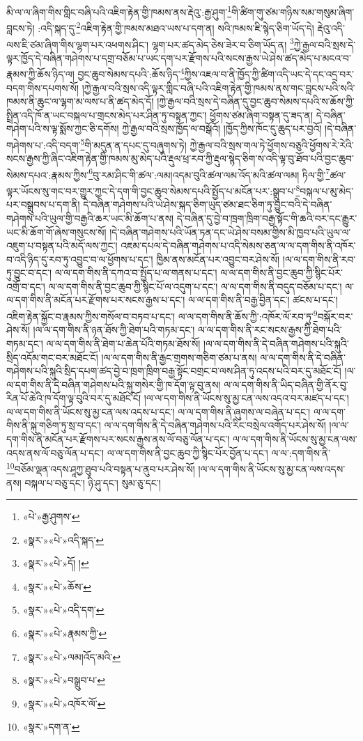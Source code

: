 མི་ལ་ལ་ཞིག་གིས་གླིང་བཞི་པའི་འཇིག་རྟེན་གྱི་ཁམས་ནས་རྡེའུ་:རྒྱ་ཤུག་\footnote{«པེ་»རྒྱ་ཤུགས་}གི་ཚིག་གུ་ཙམ་གཉིས་སམ་གསུམ་ཞིག་བླངས་ཏེ། :འདི་སྐད་དུ་\footnote{«སྣར་»«པེ་»འདི་སྐད་}འཇིག་རྟེན་གྱི་ཁམས་མཐའ་ཡས་པ་དག་ན། སའི་ཁམས་ཇི་སྙེད་ཅིག་ཡོད་དེ། རྡེའུ་འདི་ལས་ཇི་ཙམ་ཞིག་གིས་ལྷག་པར་འཕགས་ཤིང་། ལྷག་པར་ཚད་མེད་ཅེས་ཟེར་བ་ཅིག་ཡོད་ན། \footnote{«སྣར་»«པེ་»དོ། ། }ཀྱེ་རྒྱལ་བའི་སྲས་དེ་ལྟར་ཁྱོད་དེ་བཞིན་གཤེགས་པ་དགྲ་བཅོམ་པ་ཡང་དག་པར་རྫོགས་པའི་སངས་རྒྱས་ཡེ་ཤེས་ཚད་མེད་པ་མངའ་བ་རྣམས་ཀྱི་ཆོས་ཉིད་ལ། བྱང་ཆུབ་སེམས་དཔའི་:ཆོས་ཉིད་\footnote{«སྣར་»«པེ་»ཆོས་}ཀྱིས་འཇལ་བ་ནི་ཁྱོད་ཀྱི་ཚིག་འདི་ཡང་དེ་དང་འདྲ་བར་བདག་གིས་དཔགས་སོ། །ཀྱེ་རྒྱལ་བའི་སྲས་འདི་ལྟར་གླིང་བཞི་པའི་འཇིག་རྟེན་གྱི་ཁམས་ནས་གང་བླངས་པའི་སའི་ཁམས་ནི་ཆུང་ལ་ལྷག་མ་ལས་པ་ནི་ཚད་མེད་དོ། །ཀྱེ་རྒྱལ་བའི་སྲས་དེ་བཞིན་དུ་བྱང་ཆུབ་སེམས་དཔའི་ས་ཆོས་ཀྱི་སྤྲིན་འདི་ཁོ་ན་ཡང་བསྐལ་པ་གྲངས་མེད་པར་ཤིན་ཏུ་བསྟན་ཀྱང་། ཕྱོགས་ཙམ་ཞིག་བསྟན་དུ་ཟད་ན། དེ་བཞིན་གཤེག་པའི་ས་ལྟ་སྨོས་ཀྱང་ཅི་དགོས། ཀྱེ་རྒྱལ་བའི་སྲས་ཁྱོད་ལ་བསྒོའོ། །ཁྱོད་ཀྱིས་ཁོང་དུ་ཆུད་པར་བྱའོ། །དེ་བཞིན་གཤེགས་པ་:འདི་བདག་\footnote{«སྣར་»«པེ་»འདི་དག་}གི་མདུན་ན་དཔང་དུ་བཞུགས་ཏེ། ཀྱེ་རྒྱལ་བའི་སྲས་གལ་ཏེ་ཕྱོགས་བཅུའི་ཕྱོགས་རེ་རེའི་སངས་རྒྱས་ཀྱི་ཞིང་འཇིག་རྟེན་གྱི་ཁམས་མུ་མེད་པའི་རྡུལ་ཕྲ་རབ་ཀྱི་རྡུལ་སྙེད་ཅིག་ས་འདི་ལྟ་བུ་ཐོབ་པའི་བྱང་ཆུབ་སེམས་དཔའ་:རྣམས་ཀྱིས་\footnote{«སྣར་»«པེ་»རྣམས་ཀྱི་}བུ་རམ་ཤིང་གི་ཚལ་:ལམ།འདམ་བུའི་ཚལ་ལམ་འོད་མའི་ཚལ་ལམ། ཏིལ་གྱི་\footnote{«སྣར་»«པེ་»ལམ།འོད་མའི་}ཚལ་ལྟར་ཡོངས་སུ་གང་བར་གྱུར་ཀྱང་དེ་དག་གི་བྱང་ཆུབ་སེམས་དཔའི་སྤྱོད་པ་མངོན་པར་:སྒྲུབ་པ་\footnote{«སྣར་»«པེ་»བསྒྲུབ་པ་}བསྐལ་པ་མུ་མེད་པར་བསྒྲུབས་པ་དག་ནི། དེ་བཞིན་གཤེགས་པའི་ཡེ་ཤེས་སྐད་ཅིག་ཡུད་ཙམ་ཐང་ཅིག་ཏུ་བྱུང་བའི་དེ་བཞིན་གཤེགས་པའི་ཡུལ་གྱི་བརྒྱའི་ཆར་ཡང་མི་ཆོག་པ་ནས། དེ་བཞིན་དུ་བྱེ་བ་ཁྲག་ཁྲིག་བརྒྱ་སྟོང་གི་ཆའི་བར་དང་རྒྱུར་ཡང་མི་ཆོག་གོ་ཞེས་གསུངས་སོ། །དེ་བཞིན་གཤེགས་པའི་ཡོན་ཏན་དང་ཡེ་ཤེས་བསམ་གྱིས་མི་ཁྱབ་པའི་ཡུལ་ལ་འཇུག་པ་བསྟན་པའི་མདོ་ལས་ཀྱང་། འཇམ་དཔལ་དེ་བཞིན་གཤེགས་པ་འདི་སེམས་ཅན་ལ་ལ་དག་གིས་ནི་འཁོར་བ་འདི་ཉིད་དུ་རབ་ཏུ་འབྱུང་བ་ལ་ཕྱོགས་པ་དང་། ཁྱིམ་ནས་མངོན་པར་འབྱུང་བར་ཤེས་སོ། །ལ་ལ་དག་གིས་ནི་རབ་ཏུ་བྱུང་བ་དང་། ལ་ལ་དག་གིས་ནི་དཀའ་བ་སྤྱོད་པ་ལ་གནས་པ་དང་། ལ་ལ་དག་གིས་ནི་བྱང་ཆུབ་ཀྱི་སྙིང་པོར་འགྲོ་བ་དང་། ལ་ལ་དག་གིས་ནི་བྱང་ཆུབ་ཀྱི་སྙིང་པོ་ལ་འདུག་པ་དང་། ལ་ལ་དག་གིས་ནི་བདུད་བཅོམ་པ་དང་། ལ་ལ་དག་གིས་ནི་མངོན་པར་རྫོགས་པར་སངས་རྒྱས་པ་དང་། ལ་ལ་དག་གིས་ནི་བརྒྱ་བྱིན་དང་། ཚངས་པ་དང་། འཇིག་རྟེན་སྐྱོང་བ་རྣམས་ཀྱིས་གསོལ་བ་བཏབ་པ་དང་། ལ་ལ་དག་གིས་ནི་ཆོས་ཀྱི་:འཁོར་ལོ་རབ་ཏུ་\footnote{«སྣར་»«པེ་»འཁོར་ལོ་}བསྐོར་བར་ཤེས་སོ། །ལ་ལ་དག་གིས་ནི་ཉན་ཐོས་ཀྱི་ཐེག་པའི་གཏམ་དང་། ལ་ལ་དག་གིས་ནི་རང་སངས་རྒྱས་ཀྱི་ཐེག་པའི་གཏམ་དང་། ལ་ལ་དག་གིས་ནི་ཐེག་པ་ཆེན་པོའི་གཏམ་ཐོས་སོ། །ལ་ལ་དག་གིས་ནི་དེ་བཞིན་གཤེགས་པའི་སྐུའི་སྲིད་འདོམ་གང་བར་མཐོང་ངོ། །ལ་ལ་དག་གིས་ནི་རྒྱང་གྲགས་གཅིག་ཙམ་པ་ནས། ལ་ལ་དག་གིས་ནི་དེ་བཞིན་གཤེགས་པའི་སྐུའི་སྲིད་དཔག་ཚད་བྱེ་བ་ཁྲག་ཁྲིག་བརྒྱ་སྟོང་བགྲང་བ་ལས་ཤིན་ཏུ་འདས་པའི་བར་དུ་མཐོང་ངོ། །ལ་ལ་དག་གིས་ནི་དེ་བཞིན་གཤེགས་པའི་སྐུ་གསེར་གྱི་ཁ་དོག་ལྟ་བུ་ནས། ལ་ལ་དག་གིས་ནི་ཡིད་བཞིན་གྱི་ནོར་བུ་རིན་པོ་ཆེའི་ཁ་དོག་ལྟ་བུའི་བར་དུ་མཐོང་ངོ། །ལ་ལ་དག་གིས་ནི་ཡོངས་སུ་མྱ་ངན་ལས་འདའ་བར་མཛད་པ་དང་། ལ་ལ་དག་གིས་ནི་ཡོངས་སུ་མྱ་ངན་ལས་འདས་པ་དང་། ལ་ལ་དག་གིས་ནི་ཞུགས་ལ་བཞེན་པ་དང་། ལ་ལ་དག་གིས་ནི་སྐུ་གཅིག་ཏུ་སྲ་བ་དང་། ལ་ལ་དག་གིས་ནི་དེ་བཞིན་གཤེགས་པའི་རིང་བསྲེལ་འགོད་པར་ཤེས་སོ། །ལ་ལ་དག་གིས་ནི་མངོན་པར་རྫོགས་པར་སངས་རྒྱས་ནས་ལོ་བཅུ་ལོན་པ་དང་། ལ་ལ་དག་གིས་ནི་ཡོངས་སུ་མྱ་ངན་ལས་འདས་ནས་ལོ་བཅུ་ལོན་པ་དང་། ལ་ལ་དག་གིས་ནི་བྱང་ཆུབ་ཀྱི་སྙིང་པོར་བྱོན་པ་དང་། ལ་ལ་:དག་གིས་ནི་\footnote{«སྣར་»དག་ན་}བཅོམ་ལྡན་འདས་ཤཱཀྱ་ཐུབ་པའི་བསྟན་པ་ནུབ་པར་ཤེས་སོ། །ལ་ལ་དག་གིས་ནི་ཡོངས་སུ་མྱ་ངན་ལས་འདས་ནས། བསྐལ་པ་བཅུ་དང་། ཉི་ཤུ་དང་། སུམ་ཅུ་དང་། 